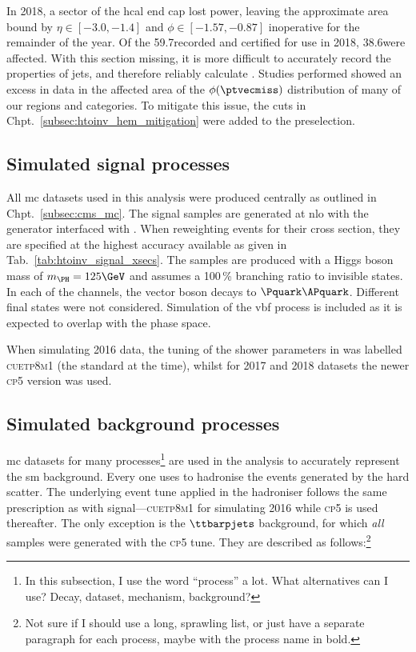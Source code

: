In 2018, a sector of the \acrshort{hcal} end cap lost power, leaving the approximate area bound by $\eta \in [-\text{3.0}, -\text{1.4}]$ and $\phi \in [-\text{1.57}, -\text{0.87}]$ inoperative for the remainder of the year. Of the 59.7\fbinv recorded and certified for use in 2018, 38.6\fbinv were affected. With this section missing, it is more difficult to accurately record the properties of \glspl{jet}, and therefore reliably calculate \ptmiss. Studies performed showed an excess in data in the affected area of the $\phi(\ptvecmiss)$ distribution of many of our regions and categories. To mitigate this issue, the cuts in Chpt.~\ref{subsec:htoinv_hem_mitigation} were added to the preselection.




\subsection{Simulated signal processes}
\label{subsec:htoinv_signal}

All \acrlong{mc} datasets used in this analysis were produced centrally as outlined in Chpt.~\ref{subsec:cms_mc}. The signal samples are generated at \acrshort{nlo} with the \POWHEG generator interfaced with \PYTHIAEIGHT. When reweighting events for their cross section, they are specified at the highest accuracy available as given in Tab.~\ref{tab:htoinv_signal_xsecs}. The samples are produced with a Higgs boson mass of $m_{\PH} = \text{125}\GeV$ and assumes a 100\,\% branching ratio to invisible states. In each of the \VH channels, the vector boson decays to $\Pquark\APquark$. Different final states were not considered. Simulation of the \acrshort{vbf} process is included as it is expected to overlap with the \ggH phase space. 

When simulating 2016 data, the tuning of the shower parameters in \PYTHIA was labelled \textsc{cuetp8m1} (the standard at the time), whilst for 2017 and 2018 datasets the newer \textsc{cp5} version was used.




\subsection{Simulated background processes}
\label{subsec:htoinv_background}

\acrlong{mc} datasets for many processes\footnote{In this subsection, I use the word ``process'' a lot. What alternatives can I use? Decay, dataset, mechanism, background?} are used in the analysis to accurately represent the \acrlong{sm} background. Every one uses \PYTHIAEIGHT to hadronise the events generated by the hard scatter. The underlying event tune applied in the hadroniser follows the same prescription as with signal---\textsc{cuetp8m1} for simulating 2016 while \textsc{cp5} is used thereafter. The only exception is the $\ttbarpjets$ background, for which \emph{all} samples were generated with the \textsc{cp5} tune. They are described as follows:\footnote{Not sure if I should use a long, sprawling list, or just have a separate paragraph for each process, maybe with the process name in bold.}

